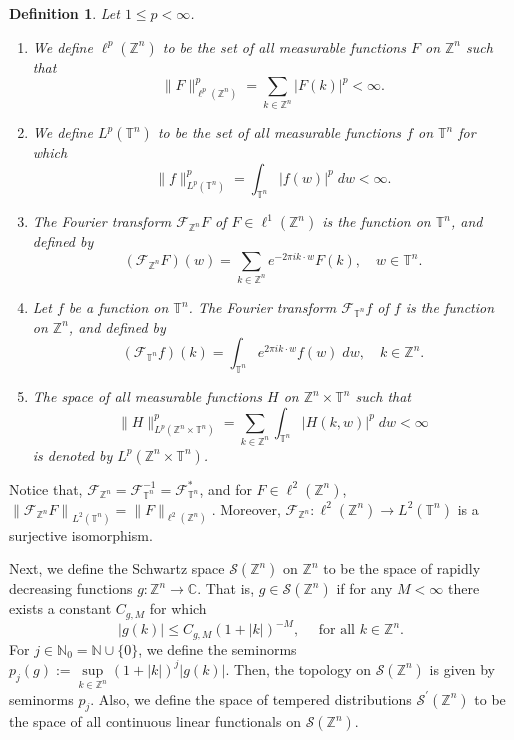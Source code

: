 \documentclass[a4paper,11pt, reqno]{amsart}
\theoremstyle{plain}
\newtheorem{Def}[theorem]{Definition}
\theoremstyle{definition}
\theoremstyle{remark}
\def \N{{\mathbb N}}
\def \T{{\mathbb T}}
\begin{document}
\begin{Def}
Let $1 \leq p<\infty$. 
\begin{enumerate}
\item We define $\ell^{p}(\mathbb{Z}^n)$ to be the set of all measurable functions $F$ on $\mathbb{Z}^n$ such that  
\[ \|F\|_{\ell^{p}(\mathbb{Z}^n)}^{p}=\sum_{k \in \mathbb{Z}^n}|F(k)|^{p}<\infty. \]

\item We define $L^{p}(\T^n)$ to be the set of all measurable functions $f$ on $\T^n$ for which
\[ \|f\|_{L^{p} (\T^n )}^{p}= \int_{\T^n} |f(w)|^{p} \;dw < \infty. \]

\item The Fourier transform $\mathcal{F}_{\mathbb{Z}^n} F$ of $F \in \ell^{1}(\mathbb{Z}^n)$ is the function on $\T^n$, and defined by
\[ \left(\mathcal{F}_{\mathbb{Z}^n} F \right)(w)=\sum_{k \in \mathbb{Z}^n} e^{-2 \pi i k \cdot w} F(k), \quad w \in \T^n. \]

\item Let $f$ be a function on $\T^n$. The Fourier transform $\mathcal{F}_{\T^n} f$ of $f$ is the function on $\mathbb{Z}^n$, and defined by
\[ \left(\mathcal{F}_{\T^n} f\right)(k)= \int_{\T^n} e^{2 \pi i k \cdot w} f(w) \;dw, \quad k \in \mathbb{Z}^n. \]

\item The space of all measurable functions $H$ on $\mathbb{Z}^n \times \T^n$ such that
\[ \|H\|_{L^{p}\left(\mathbb{Z}^n \times \T^n \right)}^{p}= \sum_{k \in \mathbb{Z}^n} \int_{\T^n}  |H(k, w)|^{p} \;dw < \infty \]
is denoted by $L^{p}\left(\mathbb{Z}^n \times \T^n \right)$. 
\end{enumerate}
\end{Def}
Notice that, $\mathcal{F}_{\mathbb{Z}^n}=\mathcal{F}_{\T^n}^{-1}=\mathcal{F}_{\T^n}^{*} $, and for $F \in \ell^{2}(\mathbb{Z}^n)$, $\left\|\mathcal{F}_{\mathbb{Z}^n} F\right\|_{L^{2}\left(\T^n\right)}=\|F\|_{\ell^{2}(\mathbb{Z}^n)}$. Moreover, $\mathcal{F}_{\mathbb{Z}^n}: \ell^{2}(\mathbb{Z}^n) \rightarrow L^{2} (\T^n)$ is a surjective isomorphism.

Next, we define the Schwartz space $\mathcal{S}\left(\mathbb{Z}^{n}\right)$ on $\mathbb{Z}^{n}$ to be the space of rapidly decreasing functions $g: \mathbb{Z}^{n} \rightarrow \mathbb{C}$. That is, $g \in \mathcal{S}\left(\mathbb{Z}^{n}\right)$ if for any $M<\infty$ there exists a constant $C_{g, M}$ for which $$|g(k)| \leq C_{g, M} (1+|k|)^{-M}, \quad \text { for all } k \in \mathbb{Z}^{n}.$$ 
For $j \in \mathbb{N}_{0}= \N \cup \{0\}$, we define the seminorms $p_{j}(g):=\sup\limits_{k \in \mathbb{Z}^{n}}(1+|k|)^{j}|g(k)|$. Then, the topology on $\mathcal{S}\left(\mathbb{Z}^{n}\right)$ is given by seminorms $p_{j}$. Also, we define the space of tempered distributions $\mathcal{S}^{\prime}\left(\mathbb{Z}^{n}\right)$ to be the space of all continuous linear functionals on $\mathcal{S}\left(\mathbb{Z}^{n}\right)$. 
 
\end{document}

